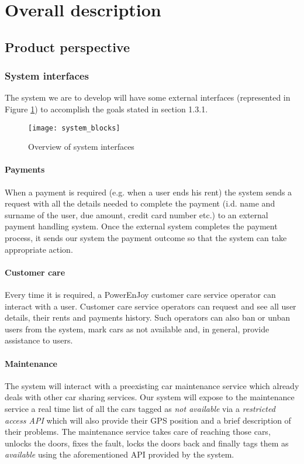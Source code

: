 \section{Overall description}
\subsection{Product perspective}
	\subsubsection{System interfaces}
	\label{sec:systemInterfaces}
		The system we are to develop will have some external interfaces (represented in Figure \ref{fig:systemInterfaces}) to accomplish the goals stated in section 1.3.1.
		\begin{figure}[h]
			\centering
			\texttt{[image: system\_blocks]}
			\caption{
				\label{fig:systemInterfaces} 
				Overview of system interfaces
			}
		\end{figure}
	\paragraph{Payments}
	When a payment is required (e.g. when a user ends his rent) the system sends a request with all the details needed to complete the payment (i.d. name and surname of the user, due amount, credit card number etc.) to an external payment handling system. Once the external system completes the payment process, it sends our system the payment outcome so that the system can take appropriate action.
	
	\paragraph{Customer care} Every time it is required, a PowerEnJoy customer care service operator can interact with a user. Customer care service operators can request and see all user details, their rents and payments history. Such operators can also ban or unban users from the system, mark cars as not available and, in general, provide assistance to users.

	\paragraph{Maintenance} The system will interact with a preexisting car maintenance service which already deals with other car sharing services. Our system will expose to the maintenance service a real time list of all the cars tagged as \emph{not available} via a \emph{restricted access API} which will also provide their GPS position and a brief description of their problems. The maintenance service takes care of reaching those cars, unlocks the doors,  fixes the fault, locks the doors back and finally tags them as \emph{available} using the aforementioned API provided by the system.
	
